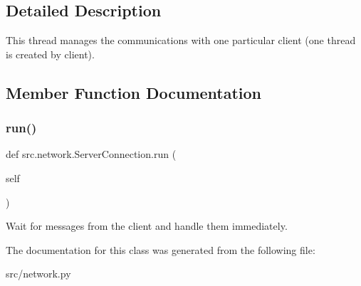 \subsection{Detailed Description}
\begin{DoxyVerb}This thread manages the communications with one particular client (one
thread is created by client).
\end{DoxyVerb}
 

\subsection{Member Function Documentation}
\hypertarget{classsrc_1_1network_1_1_server_connection_a90815003d240ea16f574c3bb718c2fe2}{}\label{classsrc_1_1network_1_1_server_connection_a90815003d240ea16f574c3bb718c2fe2} 
\subsubsection{\texorpdfstring{run()}{run()}}
{\footnotesize\ttfamily def src.\+network.\+Server\+Connection.\+run (\begin{DoxyParamCaption}\item[{}]{self }\end{DoxyParamCaption})}

\begin{DoxyVerb}Wait for messages from the client and handle them immediately.
\end{DoxyVerb}
 

The documentation for this class was generated from the following file\+:\begin{DoxyCompactItemize}
\item 
src/network.\+py\end{DoxyCompactItemize}
